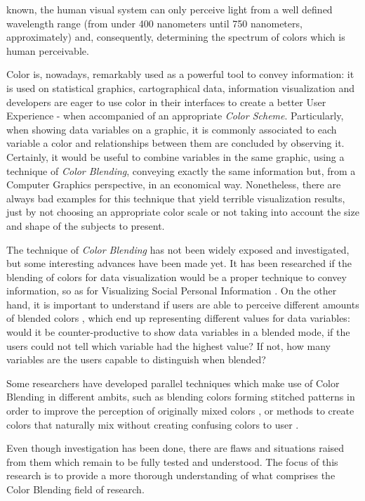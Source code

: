 \documentclass{report}
\begin{document}
known, the human visual system can only perceive light from a well defined wavelength range (from under 400
nanometers until 750 nanometers, approximately) and, consequently, determining the spectrum of colors which
is human perceivable. \par
Color is, nowadays, remarkably used as a powerful tool to convey information: it is used on statistical graphics,
cartographical data, information visualization and developers are eager to use color in their interfaces to
create a better User Experience - when accompanied of an appropriate \emph{Color Scheme}. Particularly, when showing data
variables on a graphic, it is commonly associated to each variable a color and relationships between them are
concluded by observing it. Certainly, it would be useful to combine variables in the same graphic, using a technique of
\emph{Color Blending}, conveying exactly the same information but, from a Computer Graphics perspective, in an economical way.
Nonetheless, there are always bad examples for this technique
that yield terrible visualization results, just by not choosing an appropriate color scale or not taking into
account the size and shape of the subjects to present. \par
The technique of \emph{Color Blending} has not been widely exposed and investigated, but some interesting advances have
been made yet. It has been researched if the blending of colors for data visualization \cite{Gama20141} would be a proper
technique to convey information, so as for Visualizing Social Personal Information \cite{Gama20143}. On the other hand, it is
important to understand if users are able to perceive different amounts of blended colors \cite{Gama20142}, which end up representing
different values for data variables: would it be counter-productive to show data variables in a blended mode, if
the users could not tell which variable had the highest value? If not, how many variables are the users capable
to distinguish when blended? \par
Some researchers have developed parallel techniques which make use of Color Blending in different
ambits, such as blending colors forming stitched patterns in order to improve the perception of originally mixed
colors \cite{Urness2003}, or methods to create colors that naturally mix without creating confusing colors to user \cite{Chuang2009}. \par
Even though investigation has been done, there are flaws and situations raised from them which remain to be fully tested and understood.
The focus of this research is to provide a more thorough understanding of what comprises the Color
Blending field of research.
\end{document}
